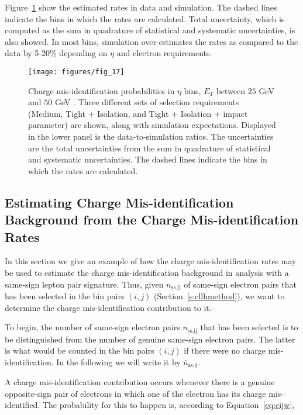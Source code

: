 Figure~\ref{f:meerates} \cite{atlaselcid} show the estimated rates in data and
simulation. The dashed lines indicate the bins in which the rates are
calculated. Total uncertainty, which is computed as the sum in quadrature of
statistical and systematic uncertainties, is also showed. In most bins,
simulation over-estimates the rates as compared to the data by 5-$20\%$
depending on $\eta$ and electron requirements.

\begin{figure}[H]
	\texttt{[image: figures/fig\_17]}
	\centering

	\caption{Charge mis-identification probabilities in $\eta$ bins, $E_T$ between
		$25$ GeV and $50$ GeV \cite{atlaselcid}. Three different sets of selection
		requirements (Medium, Tight + Isolation, and Tight + Isolation + impact
		parameter) are shown, along with simulation expectations. Displayed in the
		lower panel is the data-to-simulation ratios. The uncertainties are the total
		uncertainties from the sum in quadrature of statistical and systematic
		uncertainties. The dashed lines indicate the bins in which the rates are
		calculated.}

	\label{f:meerates}
\end{figure}



\subsection{Estimating Charge Mis-identification Background from the Charge
	Mis-identification Rates}

In this section we give an example of how the charge mis-identification rates
may be used to estimate the charge mis-identification background in analysis
with a same-sign lepton pair signature. Thus, given $n_{\text{ss,ij}}$ of
same-sign electron pairs that has been selected in the bin pairs $(i,j)$
(Section~\ref{s:cllhmethod}), we want to determine the charge
mis-identification contribution to it.


To begin, the number of same-sign electron pairs $n_{\text{ss,ij}}$ that has
been selected is to be distinguished from the number of genuine same-sign
electron pairs. The latter is what would be counted in the bin pairs $(i,j)$ if
there were no charge mis-identification. In the following we will write it by
$\bar{n}_{\text{ss,ij}}$.

A charge mis-identification contribution occurs whenever there is a genuine
opposite-sign pair of electrons in which one of the electron has its charge
mis-identified. The probability for this to happen is, according to
Equation~\ref{eq:cijw},

